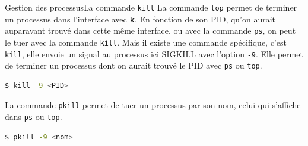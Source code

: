 \documentclass{beamer}
\begin{document}
    \begin{frame}[fragile]{Gestion des processus}{La commande \lstinline{kill}}
        La commande \lstinline{top} permet de terminer un processus dans l'interface avec \textbf{k}.
        En fonction de son PID, qu'on aurait auparavant trouvé dans cette même interface.
        ou avec la commande \lstinline{ps}, on peut le tuer avec la commande \lstinline{kill}.
        \bigbreak
        Mais il existe une commande spécifique, c'est \lstinline{kill}, elle envoie un signal au processus ici SIGKILL avec l'option \lstinline{-9}.
        Elle permet de terminer un processus dont on aurait trouvé le PID avec \lstinline{ps} ou \lstinline{top}.
        \begin{lstlisting}[language=bash]
$ kill -9 <PID>
        \end{lstlisting}
        \bigbreak
        La commande \lstinline{pkill} permet de tuer un processus par son nom, celui qui s'affiche dans \lstinline{ps} ou \lstinline{top}.
        \begin{lstlisting}[language=bash]
$ pkill -9 <nom>
        \end{lstlisting}
    \end{frame}
\end{document}
